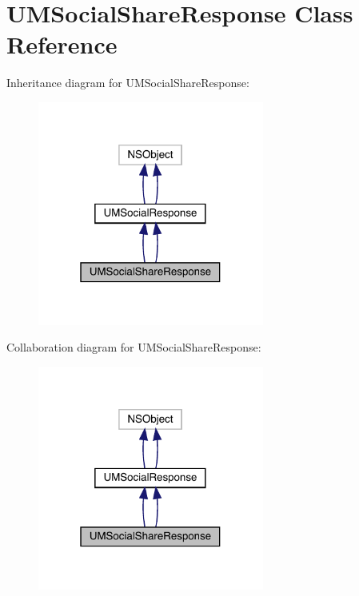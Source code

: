 \hypertarget{interface_u_m_social_share_response}{}\section{U\+M\+Social\+Share\+Response Class Reference}
\label{interface_u_m_social_share_response}


Inheritance diagram for U\+M\+Social\+Share\+Response\+:\nopagebreak
\begin{figure}[H]
\begin{center}
\leavevmode
\includegraphics[width=211pt]{interface_u_m_social_share_response__inherit__graph}
\end{center}
\end{figure}


Collaboration diagram for U\+M\+Social\+Share\+Response\+:\nopagebreak
\begin{figure}[H]
\begin{center}
\leavevmode
\includegraphics[width=211pt]{interface_u_m_social_share_response__coll__graph}
\end{center}
\end{figure}

